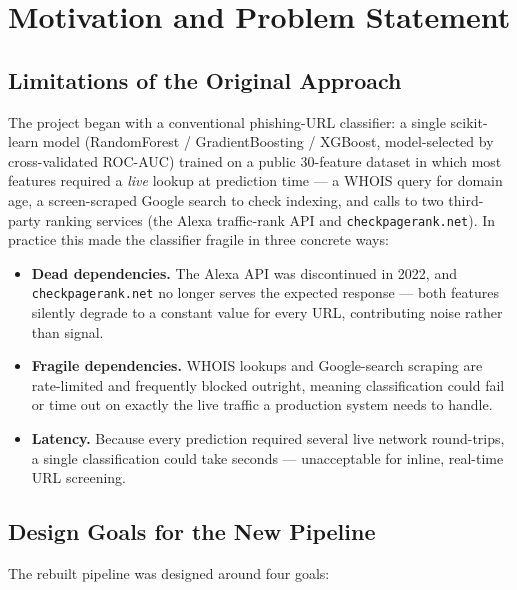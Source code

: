 \documentclass[11pt,a4paper]{report}
\begin{document}
\chapter{Motivation and Problem Statement}

\section{Limitations of the Original Approach}
The project began with a conventional phishing-URL classifier: a single
scikit-learn model (RandomForest / GradientBoosting / XGBoost, model-selected by
cross-validated ROC-AUC) trained on a public 30-feature dataset in which most
features required a \emph{live} lookup at prediction time --- a WHOIS query for
domain age, a screen-scraped Google search to check indexing, and calls to two
third-party ranking services (the Alexa traffic-rank API and
\texttt{checkpagerank.net}). In practice this made the classifier fragile in three
concrete ways:

\begin{itemize}[leftmargin=1.4em]
  \item \textbf{Dead dependencies.} The Alexa API was discontinued in 2022, and
  \texttt{checkpagerank.net} no longer serves the expected response --- both features
  silently degrade to a constant value for every URL, contributing noise rather than
  signal.
  \item \textbf{Fragile dependencies.} WHOIS lookups and Google-search scraping are
  rate-limited and frequently blocked outright, meaning classification could fail or
  time out on exactly the live traffic a production system needs to handle.
  \item \textbf{Latency.} Because every prediction required several live network
  round-trips, a single classification could take seconds --- unacceptable for
  inline, real-time URL screening.
\end{itemize}

\section{Design Goals for the New Pipeline}
The rebuilt pipeline was designed around four goals:
\end{document}
